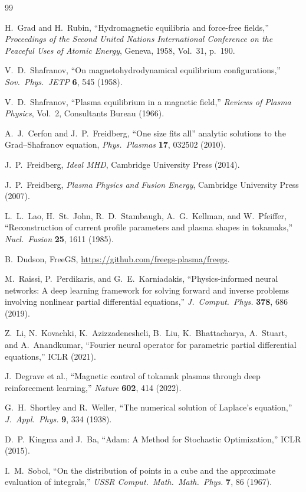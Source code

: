 \documentclass[11pt,a4paper,oneside,openany]{book}
\numberwithin{equation}{chapter}
\theoremstyle{definition}
\begin{document}
\begin{thebibliography}{99}

H.~Grad and H.~Rubin, ``Hydromagnetic equilibria and force-free fields,'' \emph{Proceedings of the Second United Nations International Conference on the Peaceful Uses of Atomic Energy}, Geneva, 1958, Vol.~31, p.~190.

V.~D.~Shafranov, ``On magnetohydrodynamical equilibrium configurations,'' \emph{Sov.\ Phys.\ JETP} \textbf{6}, 545 (1958).

V.~D.~Shafranov, ``Plasma equilibrium in a magnetic field,'' \emph{Reviews of Plasma Physics}, Vol.~2, Consultants Bureau (1966).

A.~J.~Cerfon and J.~P.~Freidberg, ``One size fits all'' analytic solutions to the Grad--Shafranov equation, \emph{Phys.\ Plasmas} \textbf{17}, 032502 (2010).

J.~P.~Freidberg, \emph{Ideal MHD}, Cambridge University Press (2014).

J.~P.~Freidberg, \emph{Plasma Physics and Fusion Energy}, Cambridge University Press (2007).

L.~L.~Lao, H.~St.~John, R.~D.~Stambaugh, A.~G.~Kellman, and W.~Pfeiffer, ``Reconstruction of current profile parameters and plasma shapes in tokamaks,'' \emph{Nucl.\ Fusion} \textbf{25}, 1611 (1985).

B.~Dudson, FreeGS, \url{https://github.com/freegs-plasma/freegs}.

M.~Raissi, P.~Perdikaris, and G.~E.~Karniadakis, ``Physics-informed neural networks: A deep learning framework for solving forward and inverse problems involving nonlinear partial differential equations,'' \emph{J.\ Comput.\ Phys.} \textbf{378}, 686 (2019).

Z.~Li, N.~Kovachki, K.~Azizzadenesheli, B.~Liu, K.~Bhattacharya, A.~Stuart, and A.~Anandkumar, ``Fourier neural operator for parametric partial differential equations,'' ICLR (2021).

J.~Degrave et al., ``Magnetic control of tokamak plasmas through deep reinforcement learning,'' \emph{Nature} \textbf{602}, 414 (2022).

G.~H.~Shortley and R.~Weller, ``The numerical solution of Laplace's equation,'' \emph{J.\ Appl.\ Phys.} \textbf{9}, 334 (1938).

D.~P.~Kingma and J.~Ba, ``Adam: A Method for Stochastic Optimization,'' ICLR (2015).

I.~M.~Sobol, ``On the distribution of points in a cube and the approximate evaluation of integrals,'' \emph{USSR Comput.\ Math.\ Math.\ Phys.} \textbf{7}, 86 (1967).

\end{thebibliography}
\end{document}
